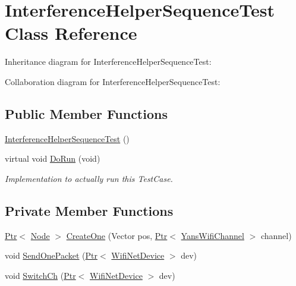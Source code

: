 \hypertarget{classInterferenceHelperSequenceTest}{}\section{Interference\+Helper\+Sequence\+Test Class Reference}
\label{classInterferenceHelperSequenceTest}


Inheritance diagram for Interference\+Helper\+Sequence\+Test\+:


Collaboration diagram for Interference\+Helper\+Sequence\+Test\+:
\subsection*{Public Member Functions}
\begin{DoxyCompactItemize}
\item 
\hyperlink{classInterferenceHelperSequenceTest_a23b2c499902b939218868bb551355979}{Interference\+Helper\+Sequence\+Test} ()
\item 
virtual void \hyperlink{classInterferenceHelperSequenceTest_a22be6f3a29ef1f34b740d8b5689f2160}{Do\+Run} (void)
\begin{DoxyCompactList}\small\item\em Implementation to actually run this Test\+Case. \end{DoxyCompactList}\end{DoxyCompactItemize}
\subsection*{Private Member Functions}
\begin{DoxyCompactItemize}
\item 
\hyperlink{classns3_1_1Ptr}{Ptr}$<$ \hyperlink{classns3_1_1Node}{Node} $>$ \hyperlink{classInterferenceHelperSequenceTest_aaf6b2c6dc1b1c6abf0743b018e78544a}{Create\+One} (Vector pos, \hyperlink{classns3_1_1Ptr}{Ptr}$<$ \hyperlink{classns3_1_1YansWifiChannel}{Yans\+Wifi\+Channel} $>$ channel)
\item 
void \hyperlink{classInterferenceHelperSequenceTest_a500c7f3465551b4e5f46d59c0fccc0eb}{Send\+One\+Packet} (\hyperlink{classns3_1_1Ptr}{Ptr}$<$ \hyperlink{classns3_1_1WifiNetDevice}{Wifi\+Net\+Device} $>$ dev)
\item 
void \hyperlink{classInterferenceHelperSequenceTest_a234954d61db7af02e56247aec19ca33d}{Switch\+Ch} (\hyperlink{classns3_1_1Ptr}{Ptr}$<$ \hyperlink{classns3_1_1WifiNetDevice}{Wifi\+Net\+Device} $>$ dev)
\end{DoxyCompactItemize}
